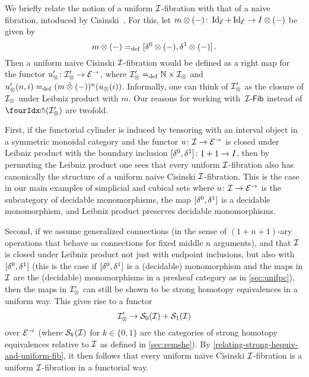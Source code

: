 \documentclass[reqno,10pt,a4paper,oneside,draft]{amsart}
\begin{document}
\begin{remark} \label{cisinski-remark}
We briefly relate the notion of a uniform $\cal{I}$-fibration with that of a naive fibration, intoduced by Cisinski~\cite{cisinski-asterisque}.
For this, let $m \otimes (-)  \co \Id_\catE + \Id_\catE \to \interval \otimes (-)$ be given by
\[
  m \otimes (-) \defeq [\lcyl \otimes (-), \rcyl \otimes (-)] \, .
\]
Then a uniform naive Cisinski $\cal{I}$-fibration would be defined as a right map for the functor $u_\otimes' \co \cal{I}_\otimes' \to \catE^\to$, where $\cal{I}_\otimes' \defeq \mathbb{N} \times \cal{I}_\otimes$ and $u_\otimes'(n, i) \defeq (m \hatotimes (-))^n(u_\otimes(i))$.
Informally, one can think of
$\cal{I}_\otimes'$ as the closure of $\cal{I}_\otimes$ under Leibniz product with $m$.
Our reasons for working with~$\Fib{\cal{I}}$ instead of $\liftr{(\cal{I}_\otimes')}$ are twofold.

First, if the functorial cylinder is induced by tensoring with an interval object in a symmetric monoidal category and the functor $u \co \cal{I} \to \catE^\to$ is closed under Leibniz product with the boundary inclusion $[\lcyl, \rcyl] \co 1 + 1 \to \interval$, then by permuting the Leibniz product one sees that every uniform $\cal{I}$-fibration also has canonically the structure of a uniform naive Cisinski $\cal{I}$-fibration.
This is the case in our main examples of simplicial and cubical sets where $u \co \cal{I} \to \catE^\to$ is the subcategory of decidable monomorphisms, the map $[\lcyl, \rcyl]$ is a decidable monomorphism, and Leibniz product preserves decidable monomorphisms.

Second, if we assume generalized connections (in the sense of $(1+n+1)$-ary operations that behave as connections for fixed middle $n$ arguments), and that $\cal{I}$ is closed under Leibniz product not just with endpoint inclusions, but also with $[\lcyl, \rcyl]$ (this is the case if $[\lcyl, \rcyl]$ is a (decidable) monomorphism and the maps in $\cal{I}$ are the (decidable) monomorphisms in a presheaf category as in \cref{sec:unifpc}), then the maps in $\cal{I}_\otimes'$ can still be shown to be strong homotopy equivalences in a uniform way.
This gives rise to a functor
\[
  \cal{I}_\otimes' \to \cal{S}_0(\cal{I}) + \cal{S}_1(\cal{I})
\]
over $\catE^\to$ (where $\cal{S}_k(\cal{I})$ for $k \in \{0,1\}$ are the categories of strong homotopy equivalences relative to $\cal{I}$ as defined in \cref{sec:remshe}).
By \cref{relating-strong-hequiv-and-uniform-fib}, it then follows that every uniform naive Cisinski $\cal{I}$-fibration is a uniform $\cal{I}$-fibration in a functorial way.
\end{remark}
\end{document}
